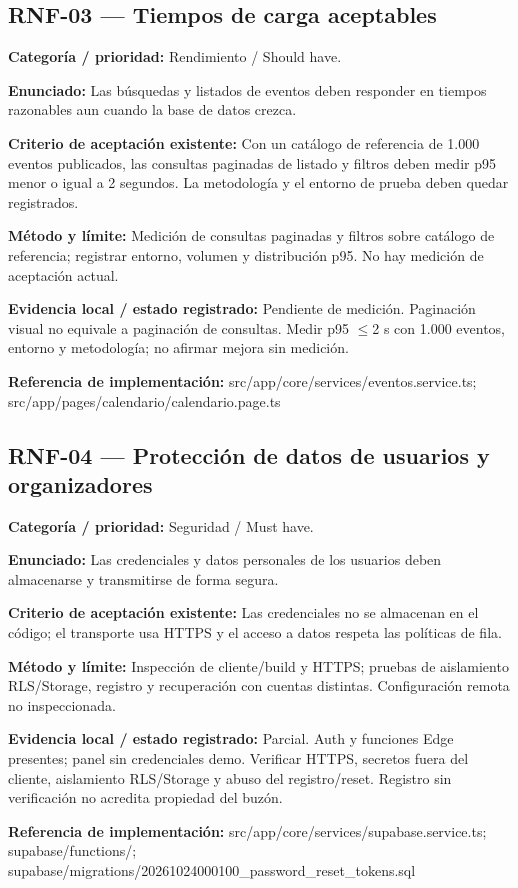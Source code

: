 \subsection{RNF-03 — Tiempos de carga aceptables}
\textbf{Categoría / prioridad:} Rendimiento / Should have.\par
\textbf{Enunciado:} Las búsquedas y listados de eventos deben responder en tiempos razonables aun cuando la base de datos crezca.\par
\textbf{Criterio de aceptación existente:} Con un catálogo de referencia de 1.000 eventos publicados, las consultas paginadas de listado y filtros deben medir p95 menor o igual a 2 segundos. La metodología y el entorno de prueba deben quedar registrados.\par
\textbf{Método y límite:} Medición de consultas paginadas y filtros sobre catálogo de referencia; registrar entorno, volumen y distribución p95. No hay medición de aceptación actual.\par
\textbf{Evidencia local / estado registrado:} Pendiente de medición. Paginación visual no equivale a paginación de consultas. Medir p95 $\leq$2 s con 1.000 eventos, entorno y metodología; no afirmar mejora sin medición.\par
\textbf{Referencia de implementación:} src/app/core/services/eventos.service.ts; src/app/pages/calendario/calendario.page.ts\par

\subsection{RNF-04 — Protección de datos de usuarios y organizadores}
\textbf{Categoría / prioridad:} Seguridad / Must have.\par
\textbf{Enunciado:} Las credenciales y datos personales de los usuarios deben almacenarse y transmitirse de forma segura.\par
\textbf{Criterio de aceptación existente:} Las credenciales no se almacenan en el código; el transporte usa HTTPS y el acceso a datos respeta las políticas de fila.\par
\textbf{Método y límite:} Inspección de cliente/build y HTTPS; pruebas de aislamiento RLS/Storage, registro y recuperación con cuentas distintas. Configuración remota no inspeccionada.\par
\textbf{Evidencia local / estado registrado:} Parcial. Auth y funciones Edge presentes; panel sin credenciales demo. Verificar HTTPS, secretos fuera del cliente, aislamiento RLS/Storage y abuso del registro/reset. Registro sin verificación no acredita propiedad del buzón.\par
\textbf{Referencia de implementación:} src/app/core/services/supabase.service.ts; supabase/functions/; supabase/migrations/20261024000100\_password\_reset\_tokens.sql\par

